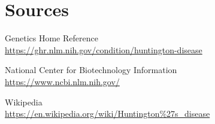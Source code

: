 \section{Sources}

\begin{description}

\large\item Genetics Home Reference\\
\small\url{https://ghr.nlm.nih.gov/condition/huntington-disease}

\medskip

\large\item National Center for Biotechnology Information\\
\small\url{https://www.ncbi.nlm.nih.gov/}

\medskip

\large\item Wikipedia\\
\small\url{https://en.wikipedia.org/wiki/Huntington\%27s_disease}

\end{description}


\newpage
